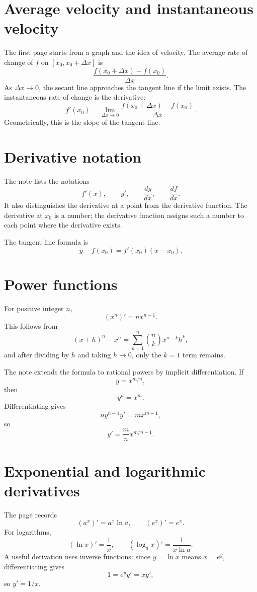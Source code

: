 
\section{Average velocity and instantaneous velocity}

The first page starts from a graph and the idea of velocity.  The average rate of change of $f$ on $[x_0,x_0+\Delta x]$ is
\[
  \frac{f(x_0+\Delta x)-f(x_0)}{\Delta x}.
\]
As $\Delta x\to0$, the secant line approaches the tangent line if the limit exists.  The instantaneous rate of change is the derivative:
\[
  f'(x_0)=\lim_{\Delta x\to0}
  \frac{f(x_0+\Delta x)-f(x_0)}{\Delta x}.
\]
Geometrically, this is the slope of the tangent line.

\section{Derivative notation}

The note lists the notations
\[
  f'(x),\qquad y',\qquad \frac{dy}{dx},\qquad \frac{df}{dx}.
\]
It also distinguishes the derivative at a point from the derivative function.  The derivative at $x_0$ is a number; the derivative function assigns such a number to each point where the derivative exists.

The tangent line formula is
\[
  y-f(x_0)=f'(x_0)(x-x_0).
\]

\section{Power functions}

For positive integer $n$,
\[
  (x^n)'=nx^{n-1}.
\]
This follows from
\[
  (x+h)^n-x^n
  =\sum_{k=1}^n \binom nk x^{n-k}h^k,
\]
and after dividing by $h$ and taking $h\to0$, only the $k=1$ term remains.

The note extends the formula to rational powers by implicit differentiation.  If
\[
  y=x^{m/n},
\]
then
\[
  y^n=x^m.
\]
Differentiating gives
\[
  ny^{n-1}y'=mx^{m-1},
\]
so
\[
  y'=\frac mn x^{m/n-1}.
\]

\section{Exponential and logarithmic derivatives}

The page records
\[
  (a^x)'=a^x\ln a,
  \qquad
  (e^x)'=e^x.
\]
For logarithms,
\[
  (\ln x)'=\frac1x,
  \qquad
  (\log_a x)'=\frac1{x\ln a}.
\]
A useful derivation uses inverse functions: since $y=\ln x$ means $x=e^y$, differentiating gives
\[
  1=e^y y'=xy',
\]
so $y'=1/x$.

